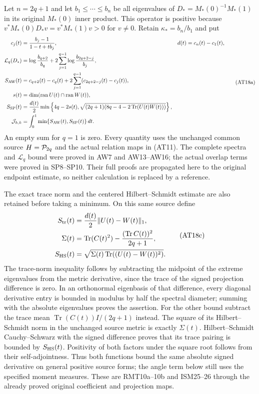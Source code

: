 Let $n=2q+1$ and let $b_1\le\cdots\le b_n$ be all eigenvalues of
$D_*=M_*(0)^{-1}M_*(1)$ in its original $M_*(0)$ inner product.
This operator is positive because
$v^*M_*(0)D_*v=v^*M_*(1)v>0$ for $v\ne0$.
Retain $\kappa_*=b_n/b_1$ and put
\[
 \begin{aligned}
 c_j(t)&=\frac{b_j-1}{1-t+tb_j},&
 d(t)&=c_n(t)-c_1(t),\\
 \mathcal L_q(D_*)&=\log\frac{b_{q+2}}{b_q}
       +2\sum_{j=1}^{q-1}\log\frac{b_{2q+2-j}}{b_j},\\
 S_{\rm AW}(t)&=c_{q+2}(t)-c_q(t)
       +2\sum_{j=1}^{q-1}(c_{2q+2-j}(t)-c_j(t)),\\
 s(t)&=\dim(\operatorname{ran}U(t)\cap\operatorname{ran}W(t)),\\
 S_{\rm SP}(t)&=\frac{d(t)}2\min\left\{
       4q-2s(t),\sqrt{(2q+1)(8q-4-2\operatorname{Tr}(U(t)W(t)))}\right\},\\
 \mathcal J_{h,k}&=\int_0^1\min\{S_{\rm AW}(t),S_{\rm SP}(t)\}\,dt.
 \end{aligned}
 \tag{AT18a}
\]
An empty sum for $q=1$ is zero. Every quantity uses the unchanged
common source $H=\mathcal P_{2q}$ and the actual relation maps in (AT11).
The complete spectra and $\mathcal L_q$ bound were proved in
AW7 and AW13--AW16; the actual overlap terms were proved in
SP8--SP10. Their full proofs are propagated here to the original
endpoint estimate, so neither calculation is replaced by a reference.



The exact trace norm and the centered Hilbert--Schmidt estimate
are also retained before taking a minimum. On this same source define
\[
 \begin{aligned}
 S_{\rm tr}(t)&=\frac{d(t)}{2}\|U(t)-W(t)\|_1,\\
 \Sigma(t)&=\operatorname{Tr}(C(t)^2)
       -\frac{(\operatorname{Tr}C(t))^2}{2q+1},\\
 S_{\rm HS}(t)&=\sqrt{\Sigma(t)\operatorname{Tr}((U(t)-W(t))^2)}.
 \end{aligned}
 \tag{AT18c}
\]
The trace-norm inequality follows by subtracting the midpoint
of the extreme eigenvalues from the metric derivative, since the
trace of the signed projection difference is zero. In an orthonormal
eigenbasis of that difference, every diagonal derivative entry is
bounded in modulus by half the spectral diameter; summing with
the absolute eigenvalues proves the assertion.
For the other bound subtract the trace mean
$\operatorname{Tr}(C(t))I/(2q+1)$ instead.
The square of its Hilbert--Schmidt norm in the unchanged source
metric is exactly $\Sigma(t)$. Hilbert--Schmidt Cauchy--Schwarz
with the signed difference proves that its trace pairing is bounded
by $S_{\rm HS}(t)$. Positivity of both factors under the square
root follows from their self-adjointness. Thus both functions bound
the same absolute signed derivative on general positive source forms;
the angle term below still uses the specified moment measures.
These are RMT10a--10b and ISM25--26 through the already proved
original coefficient and projection maps.

